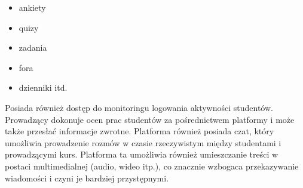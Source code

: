 	\begin{itemize}
		\item ankiety
		\item quizy
		\item zadania 
		\item fora 
		\item dzienniki itd.
	\end{itemize}
Posiada również dostęp do monitoringu logowania aktywności studentów. Prowadzący dokonuje ocen prac studentów za pośrednictwem platformy i może także przesłać informacje zwrotne. Platforma również posiada czat, który umożliwia prowadzenie rozmów w czasie rzeczywistym między studentami i prowadzącymi kurs. Platforma ta umożliwia również umieszczanie treści w postaci multimedialnej (audio, wideo itp.), co znacznie wzbogaca przekazywanie wiadomości i czyni je bardziej przystępnymi\cite{nowakowski}. 
